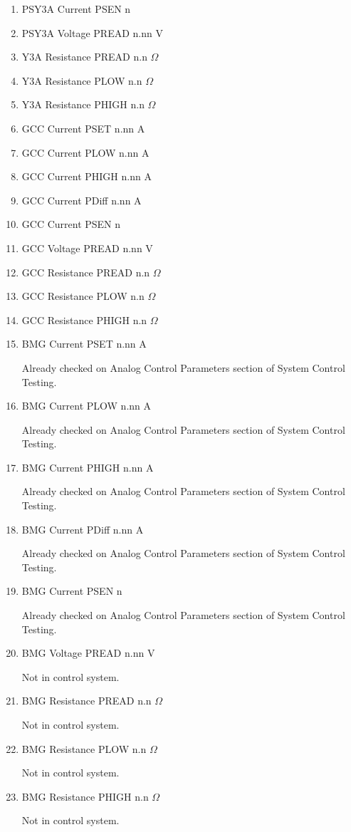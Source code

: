 \documentclass[11pt]{book}		%
\begin{document}
\begin{enumerate}
 \item PSY3A Current PSEN  n
 \item PSY3A Voltage PREAD n.nn V
 \item Y3A Resistance PREAD n.n $\Omega$
 \item Y3A Resistance PLOW n.n $\Omega$
 \item Y3A Resistance PHIGH n.n $\Omega$
 \item GCC Current PSET  n.nn A
 \item GCC Current PLOW  n.nn A
 \item GCC Current PHIGH n.nn A
 \item GCC Current PDiff n.nn A
 \item GCC Current PSEN  n
 \item GCC Voltage PREAD n.nn V
 \item GCC Resistance PREAD n.n $\Omega$
 \item GCC Resistance PLOW n.n $\Omega$
 \item GCC Resistance PHIGH n.n $\Omega$
 \item BMG Current PSET  n.nn A

\color{red}
Already checked on Analog Control Parameters section of System Control Testing.
\color{black}

 \item BMG Current PLOW  n.nn A

\color{red}
Already checked on Analog Control Parameters section of System Control Testing.
\color{black}

 \item BMG Current PHIGH n.nn A

\color{red}
Already checked on Analog Control Parameters section of System Control Testing.
\color{black}

 \item BMG Current PDiff n.nn A

\color{red}
Already checked on Analog Control Parameters section of System Control Testing.
\color{black}

 \item BMG Current PSEN  n

\color{red}
Already checked on Analog Control Parameters section of System Control Testing.
\color{black}

 \item BMG Voltage PREAD n.nn V

\color{red}
Not in control system.
\color{black}

 \item BMG Resistance PREAD n.n $\Omega$

\color{red}
Not in control system.
\color{black}

 \item BMG Resistance PLOW n.n $\Omega$

\color{red}
Not in control system.
\color{black}

 \item BMG Resistance PHIGH n.n $\Omega$

\color{red}
Not in control system.
\color{black}

\end{enumerate}
\end{document}
